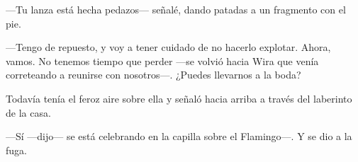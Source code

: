 ---Tu lanza está hecha pedazos--- señalé, dando patadas a un fragmento
con el pie.

---Tengo de repuesto, y voy a tener cuidado de no hacerlo explotar.
Ahora, vamos. No tenemos tiempo que perder ---se volvió hacia Wira que
venía correteando a reunirse con nosotros---. ¿Puedes llevarnos a la
boda?

Todavía tenía el feroz aire sobre ella y señaló hacia arriba a través
del laberinto de la casa.

---Sí ---dijo--- se está celebrando en la capilla sobre el Flamingo---.
Y se dio a la fuga.
